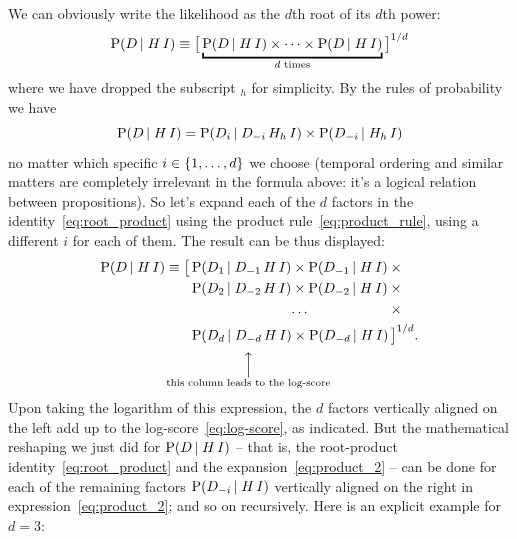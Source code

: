 \documentclass[\ifafour a4paper,12pt,\else a5paper,10pt,\fi%
onecolumn,oneside,article,%
british%
]{memoir}
\theoremstyle{remark}
\theoremstyle{innote}
\DeclarePairedDelimiter\set{\{}{\}}
\newcommand*{\p}{\mathrm{P}}%
\renewcommand*{\|}[1][]{\nonscript\,#1\vert\nonscript\;\mathopen{}}
\newcommand*{\yK}{I}
\begin{document}
We can obviously write the likelihood as the $d$th root of its $d$th power:
\begin{equation}
  \label{eq:root_product}
  \p(D \| H \, \yK) \equiv  \bigl[\,
  \underbracket{\p(D \| H \, \yK) \times \dotsm \times
  \p(D \| H \, \yK)}_{\text{$d$ times}}
  \,\bigr]^{1/d}
\end{equation}
where we have dropped the subscript ${}_{h}$ for simplicity. By the rules
of probability we have
\begin{equation}
  \label{eq:product_rule}
  \p(D \| H \, \yK) =
  \p(D_{i} \| D_{-i} \, H_{h} \, \yK) \times \p(D_{-i} \|  H_{h} \, \yK)
\end{equation}
no matter which specific $i \in \set{1, \dotsc, d}$ we choose (temporal
ordering and similar matters are completely irrelevant in the formula
above: it's a logical relation between propositions). So let's expand each
of the $d$ factors in the identity~\eqref{eq:root_product} using the
product rule~\eqref{eq:product_rule}, using a different $i$ for each of
them. The result can be thus displayed:
\begin{equation}
  \label{eq:product_2}
  \begin{aligned}
    \p(D \| H \, \yK) \equiv{}
    \bigl[\,&\p(D_{1} \| D_{-1} \, H \, \yK) \times
            \p(D_{-1} \|  H \, \yK) \times{}\\
          &\p(D_{2} \| D_{-2} \, H \, \yK) \times
            \p(D_{-2} \| H \, \yK)\times{}\\
          &\hphantom{\p(D_{2} \| D_{-2} \, H \, \yK)}
            \mathrlap{\dotso}\hphantom{{}\times  \p(D_{-2} \| H \, \yK)}\times{}\\
          &\p(D_{d} \|\underbracket[0pt][1ex]{ D_{-d} }_{\mathclap{%
              \substack{\Big\uparrow\\\text{this column leads to the log-score}}%
}} H \, \yK) \times\p(D_{-d} \|  H \, \yK)
            \,\bigr]^{1/d}.
  \end{aligned}
\end{equation}
Upon taking the logarithm of this expression, the $d$ factors vertically
aligned on the left add up to the log-score~\eqref{eq:log-score}, as
indicated. But the mathematical reshaping we just did for
$\p(D \| H \, \yK)$ -- that is, the root-product
identity~\eqref{eq:root_product} and the expansion~\eqref{eq:product_2} --
can be done for each of the remaining factors $\p(D_{-i} \| H \, \yK)$
vertically aligned on the right in expression~\eqref{eq:product_2}; and so
on recursively. Here is an explicit example for $d=3$:
\end{document}
